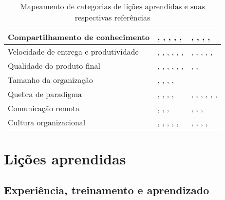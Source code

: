 \begin{table}[H]
\begin{tabularx}{\linewidth}{ | p{6cm} | X | X | }
		\hline 
		Compartilhamento de conhecimento & \cite{Asnawi2012}, \cite{Cisco2011}, \cite{Lapham2012}, \cite{Radha2012}, \cite{Eunha2012}, \cite{Ericsson2013} & \cite{Valerio2013}, \cite{Vieira2013}, \cite{Queiroz2013}, \cite{Bastos2013}, \cite{Maciel2013} \\ 
		\hline 
		Velocidade de entrega e produtividade & \cite{Adobe2012}, \cite{Fitzgerald2013}, \cite{Microsoft2013}, \cite{Cisco2011}, \cite{Korhonen2010}, \cite{Eunha2012}, \cite{Claudia2013} & \cite{Stefano2013}, \cite{Queiroz2013}, \cite{Maciel2013}, \cite{Hui2013}, \cite{Ahmed2008}, \cite{Piegas2012} \\ 
		\hline 
		Qualidade do produto final & \cite{Adobe2012}, \cite{Fitzgerald2013}, \cite{Bustard2013}, \cite{Lapham2012}, \cite{Eunha2012}, \cite{Claudia2013}, \cite{Korhonen2010} & \cite{Parzinello2012}, \cite{Maciel2013}, \cite{Ahmed2008} \\ 
		\hline 
		Tamanho da organização & \cite{Bustard2013}, \cite{Microsoft2013}, \cite{Claudia2013}, \cite{Korhonen2010}, \cite{Ericsson2013} & \cite{Maciel2013} \\ 
		\hline 
		Quebra de paradigma & \cite{Hajjdiab2011}, \cite{Block2011}, \cite{Korhonen2010}, \cite{Lapham2012}, \cite{Arikpo2011} & \cite{Stefano2013}, \cite{Bastos2013}, \cite{Maciel2013}, \cite{Parzinello2012}, \cite{Hui2013}, \cite{Ahmed2008}, \cite{Sahota2012} \\ 
		\hline 
		Comunicação remota & \cite{Adobe2012}, \cite{Microsoft2013}, \cite{Korhonen2010}, \cite{Radha2012} & \cite{Rodrigues2013}, \cite{Vieira2013}, \cite{Bastos2013}, \cite{Maciel2013} \\ 
		\hline 
		Cultura organizacional & \cite{Bustard2013}, \cite{Microsoft2013}, \cite{Claudia2013}, \cite{Nokia2013}, \cite{Eunha2012}, \cite{Fitzgerald2013} & \cite{Rodrigues2013}, \cite{Bastos2013}, \cite{Srinath2012}, \cite{Maciel2013}, \cite{Sahota2012} \\ 
		\hline 
	\end{tabularx}
	\caption{Mapeamento de categorias de lições aprendidas e suas respectivas referências}
	\label{tab:mapeamentoCategorias}
\end{table}

\section{Lições aprendidas}

\subsection{Experiência, treinamento e aprendizado}

